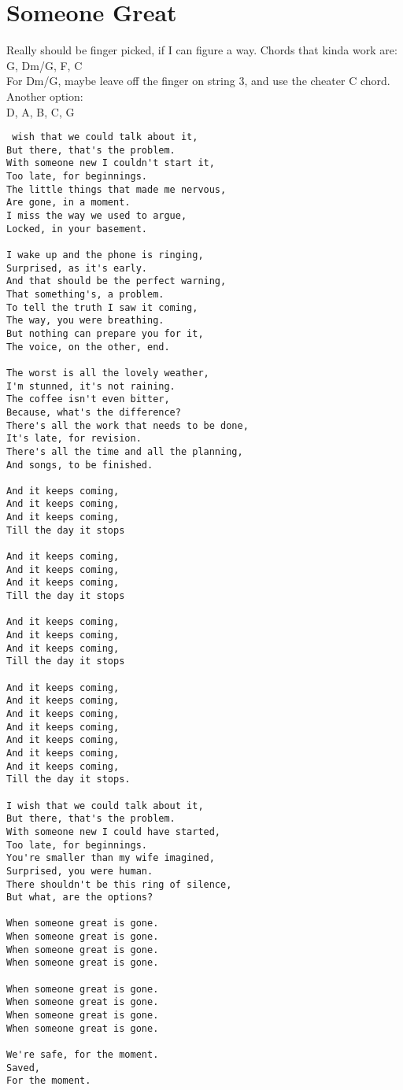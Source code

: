 \documentclass[leqno]{memoir}
\begin{document}
\chapter{Someone Great}
Really should be finger picked, if I can figure a way.
Chords that kinda work are:\\
G, Dm/G, F, C \\
For Dm/G, maybe leave off the finger on string 3,
and use the cheater C chord. \\
Another option: \\
D, A, B, C, G
\begin{verbatim}
 wish that we could talk about it,
But there, that's the problem.
With someone new I couldn't start it,
Too late, for beginnings.
The little things that made me nervous,
Are gone, in a moment.
I miss the way we used to argue,
Locked, in your basement.

I wake up and the phone is ringing,
Surprised, as it's early.
And that should be the perfect warning,
That something's, a problem.
To tell the truth I saw it coming,
The way, you were breathing.
But nothing can prepare you for it,
The voice, on the other, end.

The worst is all the lovely weather,
I'm stunned, it's not raining.
The coffee isn't even bitter,
Because, what's the difference?
There's all the work that needs to be done,
It's late, for revision.
There's all the time and all the planning,
And songs, to be finished.

And it keeps coming,
And it keeps coming,
And it keeps coming,
Till the day it stops

And it keeps coming,
And it keeps coming,
And it keeps coming,
Till the day it stops

And it keeps coming,
And it keeps coming,
And it keeps coming,
Till the day it stops

And it keeps coming,
And it keeps coming,
And it keeps coming,
And it keeps coming,
And it keeps coming,
And it keeps coming,
And it keeps coming,
Till the day it stops.

I wish that we could talk about it,
But there, that's the problem.
With someone new I could have started,
Too late, for beginnings.
You're smaller than my wife imagined,
Surprised, you were human.
There shouldn't be this ring of silence,
But what, are the options?

When someone great is gone.
When someone great is gone.
When someone great is gone.
When someone great is gone.

When someone great is gone.
When someone great is gone.
When someone great is gone.
When someone great is gone.

We're safe, for the moment.
Saved,
For the moment.
\end{verbatim}
\newpage
\end{document}
